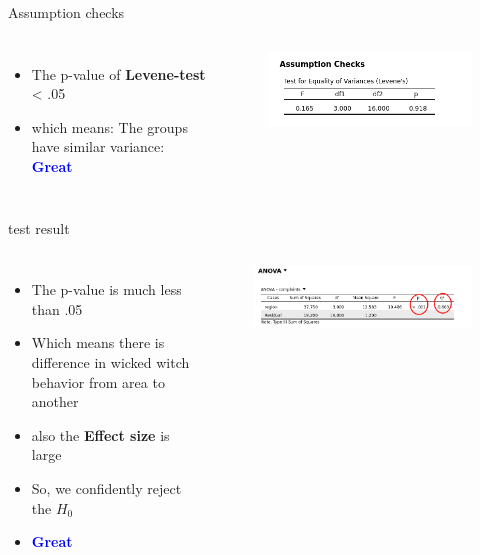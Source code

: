 \documentclass[8pt]{beamer}
\begin{document}
        \begin{frame}{Assumption checks}
            \begin{columns}
                \begin{itemize}
                    \item The p-value of \textbf{Levene-test} < .05
                    \item which means: The groups have similar variance: \textcolor{blue}{\textbf{Great}}
                \end{itemize}
                \begin{figure}
                    \includegraphics[width=.95\textwidth]{images/ANOVA assumptions.png}
                    \vspace{.25cm}
                \end{figure}
            \end{columns}
        \end{frame}

        \begin{frame}{test result}
            \begin{columns}
                \begin{itemize}
                    \item The p-value is much less than .05
                    \item Which means there is difference in wicked witch behavior from area to another
                    \item also the \textbf{Effect size} is large
                    \item So, we confidently reject the $H_0$
                    \item \textcolor{blue}{\textbf{Great}}
                \end{itemize}
                \begin{figure}
                    \includegraphics[width=.95\textwidth]{images/ANOVA result.png}
                    \vspace{.25cm}
                \end{figure}
            \end{columns}
        \end{frame}
\end{document}
